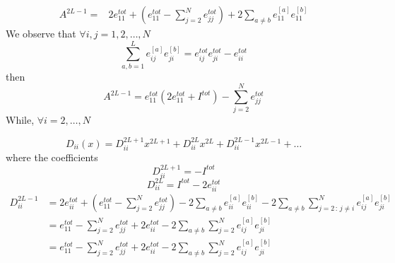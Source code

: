 \documentclass[11pt]{article}
\numberwithin{equation}{section}
\numberwithin{equation}{subsection}
\begin{document}
\begin{equation}
	\begin{split}
		A^{2L-1}=&2e_{11}^{tot}+\left(e_{11}^{tot}-\sum_{j=2}^{N}e_{jj}^{tot}\right)+2\sum_{a\neq b}e_{11}^{[a]}e_{11}^{[b]}
	\end{split}
\end{equation}
We observe that $\forall i,j=1,2,\ldots,N$
\begin{equation}
	\sum_{a,b=1}^{L}e_{ij}^{[a]}e_{ji}^{[b]}=e_{ij}^{tot}e_{ji}^{tot}-e_{ii}^{tot}
\end{equation}
then 
\begin{equation}
	\boxed{A^{2L-1}=e_{11}^{tot}\left(2e_{11}^{tot}+I^{tot}\right)-\sum_{j=2}^{N}e_{jj}^{tot}}
\end{equation}
While, $\forall i=2,\ldots,N$


\begin{equation}
	D_{ii}(x)=D_{ii}^{2L+1}x^{2L+1}+D_{ii}^{2L}x^{2L}+D_{ii}^{2L-1}x^{2L-1}+\ldots
\end{equation}
where the coefficients
\begin{equation}\label{a2lp}
	D_{ii}^{2L+1}=-I^{tot}
\end{equation}\begin{equation}\label{a2l}
	D_{ii}^{2L}=I^{tot}-2e_{ii}^{tot}
\end{equation}
\begin{equation}\label{a2lm1}
	\begin{split}
		D_{ii}^{2L-1}&=2e_{ii}^{tot}+\left(e_{11}^{tot}-\sum_{j=2}^{N}e_{jj}^{tot}\right)-2\sum_{a\neq b}e_{ii}^{[a]}e_{ii}^{[b]}-2\sum_{a\neq b}\sum_{j=2\,:\,j\neq i}^{N}e_{ij}^{[a]}e_{ji}^{[b]}\\
		&=e_{11}^{tot}-\sum_{j=2}^{N}e_{jj}^{tot}+2e_{ii}^{tot}-2\sum_{a\neq b}\sum_{j=2}^{N}e_{ij}^{[a]}e_{ji}^{[b]}\\
		&=e_{11}^{tot}-\sum_{j=2}^{N}e_{jj}^{tot}+2e_{ii}^{tot}-2\sum_{a\neq b}\sum_{j=2}^{N}e_{ij}^{[a]}e_{ji}^{[b]}\\ 
	\end{split}
\end{equation}
\end{document}
